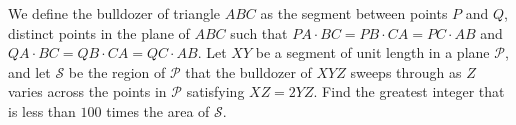 We define the bulldozer of triangle $ABC$ as the segment between points $P$ and $Q$, distinct points in the plane of $ABC$ such that $PA\cdot BC=PB\cdot CA=PC\cdot AB$ and $QA\cdot BC=QB\cdot CA=QC\cdot AB$. Let $XY$ be a segment of unit length in a plane $\mathcal{P}$, and let $\mathcal{S}$ be the region of $\mathcal P$ that the bulldozer of $XYZ$ sweeps through as $Z$ varies across the points in $\mathcal{P}$ satisfying $XZ=2YZ$. Find the greatest integer that is less than $100$ times the area of $\mathcal S$.
